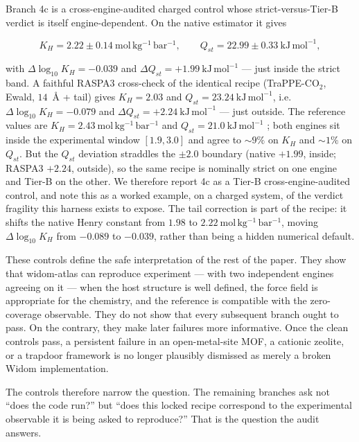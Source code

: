 Branch 4c is a cross-engine-audited charged control whose strict-versus-Tier-B verdict is itself engine-dependent. On the native estimator it gives

\[
K_H = 2.22 \pm 0.14\ \mathrm{mol\,kg^{-1}\,bar^{-1}},
\qquad
Q_{st} = 22.99 \pm 0.33\ \mathrm{kJ\,mol^{-1}},
\]

with \(\Delta \log_{10} K_H = -0.039\) and \(\Delta Q_{st} = +1.99\ \mathrm{kJ\,mol^{-1}}\) --- just inside the strict band. A faithful RASPA3 cross-check of the identical recipe (TraPPE-CO\(_2\), Ewald, \(14\)~\AA{} + tail) gives \(K_H = 2.03\) and \(Q_{st} = 23.24\ \mathrm{kJ\,mol^{-1}}\), i.e.\ \(\Delta \log_{10} K_H = -0.079\) and \(\Delta Q_{st} = +2.24\ \mathrm{kJ\,mol^{-1}}\) --- just outside. The reference values are \(K_H = 2.43\ \mathrm{mol\,kg^{-1}\,bar^{-1}}\) and \(Q_{st} = 21.0\ \mathrm{kJ\,mol^{-1}}\) \cite{Bai2013JPCC,Maghsoudi2013Adsorption}; both engines sit inside the experimental window \([1.9, 3.0]\) and agree to \(\sim\!9\%\) on \(K_H\) and \(\sim\!1\%\) on \(Q_{st}\). But the \(Q_{st}\) deviation straddles the \(\pm 2.0\) boundary (native \(+1.99\), inside; RASPA3 \(+2.24\), outside), so the same recipe is nominally strict on one engine and Tier-B on the other. We therefore report 4c as a Tier-B cross-engine-audited control, and note this as a worked example, on a charged system, of the verdict fragility this harness exists to expose. The tail correction is part of the recipe: it shifts the native Henry constant from \(1.98\) to \(2.22\ \mathrm{mol\,kg^{-1}\,bar^{-1}}\), moving \(\Delta \log_{10}K_H\) from \(-0.089\) to \(-0.039\), rather than being a hidden numerical default.

These controls define the safe interpretation of the rest of the paper. They show that widom-atlas can reproduce experiment --- with two independent engines agreeing on it --- when the host structure is well defined, the force field is appropriate for the chemistry, and the reference is compatible with the zero-coverage observable. They do not show that every subsequent branch ought to pass. On the contrary, they make later failures more informative. Once the clean controls pass, a persistent failure in an open-metal-site MOF, a cationic zeolite, or a trapdoor framework is no longer plausibly dismissed as merely a broken Widom implementation.

The controls therefore narrow the question. The remaining branches ask not ``does the code run?'' but ``does this locked recipe correspond to the experimental observable it is being asked to reproduce?'' That is the question the audit answers.
